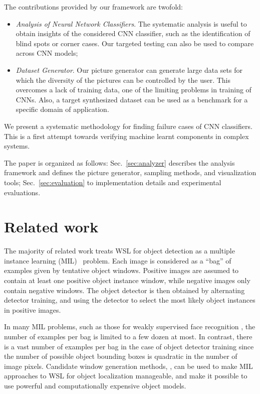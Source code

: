 \documentclass[10pt,journal,cspaper,final,twocolumn,compsoc]{./IEEEtran}
\begin{document}
The contributions provided by our framework are twofold:
\begin{itemize}
	\item \emph{Analysis of Neural Network Classifiers}. The systematic analysis is
		useful to obtain insights of the considered CNN classifier,
		such as the identification of blind spots or corner cases. 
		Our targeted testing can also be used to
		compare across CNN models;
	\item \emph{Dataset Generator}. Our picture generator can
		generate large data sets for which the diversity
		of the pictures can be controlled by the user.
		This overcomes a lack of training data,
		one of the limiting problems in training of CNNs.
		Also, a target synthesized dataset can be used as a 
		benchmark for a specific domain of application.
\end{itemize}

We present a systematic methodology for finding failure cases of CNN classifiers. This is a first attempt towards verifying machine learnt components in complex systems.

The paper is organized as follows: Sec.~\ref{sec:analyzer} describes the
analysis framework and defines the picture generator, sampling methods,
and visualization tools; Sec.~\ref{sec:evaluation} to implementation
details and experimental evaluations.


\section{Related work}\label{sec:related}

The majority of related work treats WSL for object
detection as a multiple instance learning
(MIL)~\cite{dietterich97ai} problem. Each image is
considered as a ``bag'' of examples given by tentative
object windows. Positive images are assumed to contain at
least one positive object instance window, while negative
images only contain negative windows. The object detector
is then obtained by alternating detector training, and
using the detector to select the most likely object
instances in positive images. 

In many MIL problems, \eg such as those for weakly
supervised face recognition
\cite{berg04cvpr,everingham09ivc}, the number of examples
per bag is limited to a few dozen at most.  In contrast,
there is a vast number of examples per bag in the case of
object detector training since the number of possible
object bounding boxes is quadratic in the number of image
pixels. Candidate window generation methods, \eg\cite{alexe10cvpr,gu12eccv,uijlings13ijcv,zitnick14eccv}, can be
used to make MIL approaches to WSL for object localization manageable, and make it
possible to use powerful and computationally
expensive  object models. 
\end{document}
